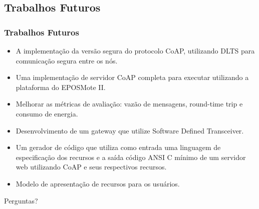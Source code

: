\documentclass{beamer}
\begin{document}
\subsection{Trabalhos Futuros}
\begin{frame}
\frametitle{Trabalhos Futuros}

\begin{itemize}
    \item A implementa\c{c}\~ao da vers\~ao segura do protocolo CoAP, utilizando DLTS para comunica\c{c}\~ao segura entre os n\'os.
    \item Uma implementa\c{c}\~ao de servidor CoAP completa para executar utilizando a plataforma do EPOSMote II.
    \item Melhorar as métricas de avaliação: vazão de mensagens, round-time trip e consumo de energia.

    \item Desenvolvimento de um gateway que utilize Software Defined Transceiver.

    \item Um gerador de c\'odigo que utiliza como entrada uma linguagem de especifica\c{c}\~ao dos recursos e a sa\'ida c\'odigo ANSI C m\'inimo de um servidor web utilizando CoAP e seus respectivos recursos.

    \item Modelo de apresentação de recursos para os usuários.
\end{itemize}
\end{frame}




%




\begin{frame}
\Huge{\centerline{Perguntas?}}
\end{frame}

\end{document}
